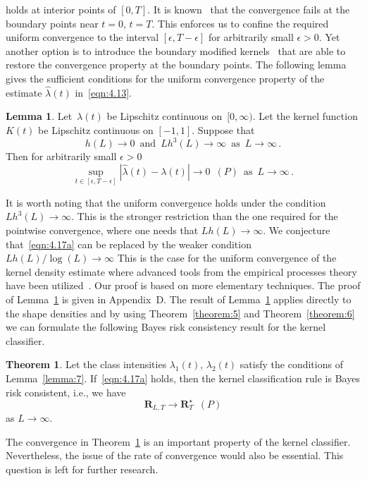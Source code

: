 \documentclass[lettersize,journal,onecolumn]{IEEEtran}
\theoremstyle{definition}
\newtheorem{theorem}{Theorem}
\newtheorem{lemma}{Lemma}
\begin{document}
holds at interior points of $[0,T]$. It is
known~\cite{wand1994kernel, diggle1988equivalence} that the convergence fails at the
boundary points near $t=0$, \enspace$t=T$. This enforces us to confine the required
uniform convergence to the interval $[\epsilon, T-\epsilon]$ for arbitrarily
small $\epsilon>0$. Yet another option
is to introduce the boundary modified 
kernels~\cite{diggle1988equivalence, cattaneo2020simple} that are able to restore the 
convergence property at the boundary points. 
The following lemma gives the sufficient conditions for the uniform
convergence property of the estimate $\widehat{\lambda}(t)$ in~\eqref{eqn:4.13}.
\begin{lemma}
	\label{lemma:8}
	Let~$\lambda(t)$ be  Lipschitz continuous on~$[0,\infty)$. 
	Let the kernel function $K(t)$ be Lipschitz continuous on $[-1,1]$.
	Suppose 
	that
	\begin{equation}
		h(L) \to 0
		\enspace \text{and}
		\enspace Lh^{3}(L) \to \infty
		\enspace \text{as}
		\enspace L \to \infty
		\label{eqn:4.17a}\,.
	\end{equation}
	Then for arbitrarily small $\epsilon>0$
	\begin{equation}
		\sup_{t\in\left[\epsilon, T-\epsilon\right]} \left|
		\widehat{\lambda}(t)-\lambda(t)
		\right| \to 0
		\enspace (P)
		\enspace \text{as}
		\enspace L \to \infty
		\label{eqn:4.18}\,.
	\end{equation}
\end{lemma}

It is worth noting that the uniform convergence holds under the condition 
\mbox{$Lh^{3}(L)\to\infty$}. This is the stronger restriction than the one required
for the pointwise
convergence, where one needs that \mbox{$Lh(L)\to\infty$}. We conjecture 
that~\eqref{eqn:4.17a} can be replaced by the weaker condition 
\mbox{$Lh(L)/\log(L)\to\infty$} This is the case for the uniform convergence of the 
kernel density estimate where advanced tools from the empirical processes theory have 
been utilized~\cite{gine2002rates,masry1996multivariate}. Our proof is based on more 
elementary techniques. The proof of Lemma~\ref{lemma:8} is given in Appendix~D. The
result of Lemma~\ref{lemma:8} applies directly to the shape densities and by using 
Theorem~\ref{theorem:5} and Theorem~\ref{theorem:6} we can formulate the following Bayes 
risk consistency result for the kernel classifier.
\begin{theorem}
	\label{theorem:7}
	Let the class intensities $\lambda_{1}(t)$, $\lambda_{2}(t)$
	satisfy the conditions of Lemma~\ref{lemma:7}. 
	If~\eqref{eqn:4.17a} holds, then the kernel classification rule is Bayes risk 
	consistent, i.e., we have
	\begin{equation*}
		\mathbf{R}_{L,T} \to \mathbf{R}_{T}^{\star}
		\enspace (P)
	\end{equation*}
	as $L\to\infty$.
\end{theorem}
The convergence in Theorem~\ref{theorem:7} is an important property of the kernel 
classifier. Nevertheless, the issue of the rate of convergence would also be essential. 
This question is left for further research.
\end{document}
